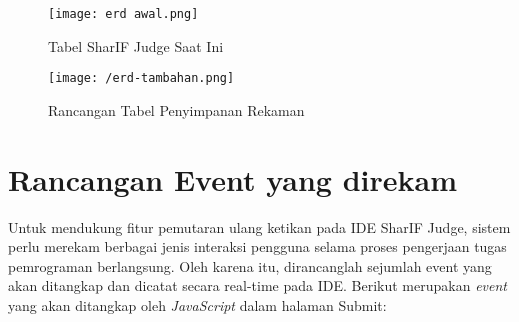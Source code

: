 \begin{figure}
\centering
\texttt{[image: erd awal.png]}
\caption{Tabel SharIF Judge Saat Ini}
\label{fig:4:erdawal}
\end{figure}

\begin{figure}
\centering
\texttt{[image: /erd-tambahan.png]}
\caption{Rancangan Tabel Penyimpanan Rekaman}
\label{fig:4:erdrekaman}
\end{figure}


\section{Rancangan Event yang direkam}

Untuk mendukung fitur pemutaran ulang ketikan pada IDE SharIF Judge, sistem perlu merekam berbagai jenis interaksi pengguna selama proses pengerjaan tugas pemrograman berlangsung. Oleh karena itu, dirancanglah sejumlah event yang akan ditangkap dan dicatat secara real-time pada IDE. Berikut merupakan \textit{event} yang akan ditangkap oleh \textit{JavaScript} dalam halaman Submit:

